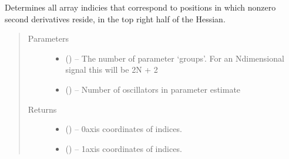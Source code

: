 \documentclass[letterpaper,10pt,english]{sphinxmanual}
\begin{document}
\begin{fulllineitems}
\label{\detokenize{references/nlp/_funcs:nmrespy.nlp._funcs._generate_diagonal_indices}}
\sphinxAtStartPar
Determines all array indicies that correspond to positions in which
non\sphinxhyphen{}zero second derivatives reside, in the top right half of the Hessian.
\begin{quote}\begin{description}
\item[{Parameters}] \leavevmode\begin{itemize}
\item {} 
\sphinxAtStartPar
{} () – The number of parameter ‘groups’. For an N\sphinxhyphen{}dimensional signal this
will be 2N + 2

\item {} 
\sphinxAtStartPar
{} () – Number of oscillators in parameter estimate

\end{itemize}

\item[{Returns}] \leavevmode
\sphinxAtStartPar
\begin{itemize}
\item {} 
\sphinxAtStartPar
{} () – 0\sphinxhyphen{}axis coordinates of indices.

\item {} 
\sphinxAtStartPar
{} () – 1\sphinxhyphen{}axis coordinates of indices.

\end{itemize}


\end{description}\end{quote}

\end{fulllineitems}

\end{document}
